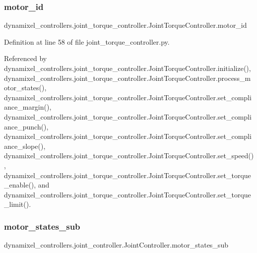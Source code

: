 \subsubsection{\texorpdfstring{motor\+\_\+id}{motor\_id}}
{\footnotesize\ttfamily dynamixel\+\_\+controllers.\+joint\+\_\+torque\+\_\+controller.\+Joint\+Torque\+Controller.\+motor\+\_\+id}



Definition at line 58 of file joint\+\_\+torque\+\_\+controller.\+py.



Referenced by dynamixel\+\_\+controllers.\+joint\+\_\+torque\+\_\+controller.\+Joint\+Torque\+Controller.\+initialize(), dynamixel\+\_\+controllers.\+joint\+\_\+torque\+\_\+controller.\+Joint\+Torque\+Controller.\+process\+\_\+motor\+\_\+states(), dynamixel\+\_\+controllers.\+joint\+\_\+torque\+\_\+controller.\+Joint\+Torque\+Controller.\+set\+\_\+compliance\+\_\+margin(), dynamixel\+\_\+controllers.\+joint\+\_\+torque\+\_\+controller.\+Joint\+Torque\+Controller.\+set\+\_\+compliance\+\_\+punch(), dynamixel\+\_\+controllers.\+joint\+\_\+torque\+\_\+controller.\+Joint\+Torque\+Controller.\+set\+\_\+compliance\+\_\+slope(), dynamixel\+\_\+controllers.\+joint\+\_\+torque\+\_\+controller.\+Joint\+Torque\+Controller.\+set\+\_\+speed(), dynamixel\+\_\+controllers.\+joint\+\_\+torque\+\_\+controller.\+Joint\+Torque\+Controller.\+set\+\_\+torque\+\_\+enable(), and dynamixel\+\_\+controllers.\+joint\+\_\+torque\+\_\+controller.\+Joint\+Torque\+Controller.\+set\+\_\+torque\+\_\+limit().

\mbox{\label{classdynamixel__controllers_1_1joint__controller_1_1_joint_controller_affc8be5e697a2ae71d284d8e0e59a4bd}} 
\subsubsection{\texorpdfstring{motor\+\_\+states\+\_\+sub}{motor\_states\_sub}}
{\footnotesize\ttfamily dynamixel\+\_\+controllers.\+joint\+\_\+controller.\+Joint\+Controller.\+motor\+\_\+states\+\_\+sub\hspace{0.3cm}{\ttfamily [inherited]}}



